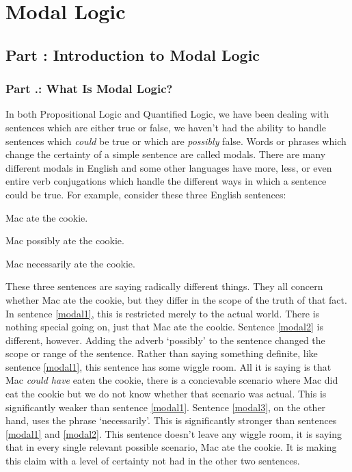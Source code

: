 \part{Modal Logic}
\label{ch.ml1}
\setcounter{seccount}{1}
\chapter{Part \thechapcount: Introduction to Modal Logic}
\section{Part \thechapcount.\theseccount: What Is Modal Logic?}
In both Propositional Logic and Quantified Logic, we have been dealing with sentences which are either true or false, we haven't had the ability to handle sentences which \emph{could} be true or which are \emph{possibly} false. Words or phrases which change the certainty of a simple sentence are called \glspl{modal}. There are many different modals in English and some other languages have more, less, or even entire verb conjugations which handle the different ways in which a sentence could be true. For example, consider these three English sentences:

\setcounter{Example}{0}
\begin{earg}
	\item[\ex{modal1}] Mac ate the cookie.
	\item[\ex{modal2}] Mac possibly ate the cookie.
	\item[\ex{modal3}] Mac necessarily ate the cookie. 
\end{earg}

These three sentences are saying radically different things. They all concern whether Mac ate the cookie, but they differ in the scope of the truth of that fact.  In sentence \ref{modal1}, this is restricted merely to the actual world. There is nothing special going on, just that Mac ate the cookie. Sentence \ref{modal2} is different, however. Adding the adverb `possibly' to the sentence changed the scope or range of the sentence. Rather than saying something definite, like sentence \ref{modal1}, this sentence has some wiggle room. All it is saying is that Mac \emph{could have} eaten the cookie, there is a concievable scenario where Mac did eat the cookie but we do not know whether that scenario was actual. This is significantly weaker than sentence \ref{modal1}. Sentence \ref{modal3}, on the other hand, uses the phrase `necessarily'. This is significantly stronger than sentences \ref{modal1} and \ref{modal2}. This sentence doesn't leave any wiggle room, it is saying that in every single relevant possible scenario, Mac ate the cookie. It is making this claim with a level of certainty not had in the other two sentences. 

